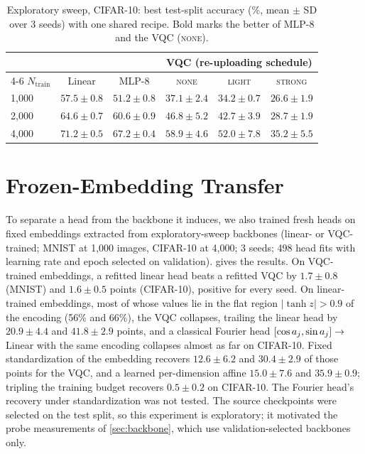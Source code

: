 \begin{table}[h]
\centering
\caption{Exploratory sweep, CIFAR-10: best test-split accuracy (\%, mean $\pm$ SD over 3
seeds) with one shared recipe. Bold marks the better of MLP-8 and the VQC (\textsc{none}).}
\label{tab:cifar}
\small
\begin{tabular}{lccccc}
\toprule
& & & \multicolumn{3}{c}{VQC (re-uploading schedule)} \\
\cmidrule(lr){4-6}
$N_\mathrm{train}$ & Linear & MLP-8 & \textsc{none} & \textsc{light} & \textsc{strong} \\
\midrule
1,000 & $57.5 \pm 0.8$ & $\mathbf{51.2 \pm 0.8}$ & $37.1 \pm 2.4$ & $34.2 \pm 0.7$ & $26.6 \pm 1.9$ \\
2,000 & $64.6 \pm 0.7$ & $\mathbf{60.6 \pm 0.9}$ & $46.8 \pm 5.2$ & $42.7 \pm 3.9$ & $28.7 \pm 1.9$ \\
4,000 & $71.2 \pm 0.5$ & $\mathbf{67.2 \pm 0.4}$ & $58.9 \pm 4.6$ & $52.0 \pm 7.8$ & $35.2 \pm 5.5$ \\
\bottomrule
\end{tabular}
\end{table}

\section{Frozen-Embedding Transfer}
\label{app:frozen}

To separate a head from the backbone it induces, we also trained fresh heads on fixed
embeddings extracted from exploratory-sweep backbones (linear- or VQC-trained; MNIST at
1,000 images, CIFAR-10 at 4,000; 3 seeds; 498 head fits with learning rate and epoch selected
on validation).  gives the results. On VQC-trained embeddings, a refitted
linear head beats a refitted VQC by $1.7\pm0.8$ (MNIST) and $1.6\pm0.5$ points (CIFAR-10),
positive for every seed. On linear-trained embeddings, most of whose values lie in the flat
region $|\tanh z|>0.9$ of the encoding (56\% and 66\%), the VQC collapses, trailing the
linear head by $20.9\pm4.4$ and $41.8\pm2.9$ points, and a classical Fourier head
$[\cos a_{j},\sin a_{j}]\to$ Linear with the same encoding collapses almost as far on
CIFAR-10. Fixed standardization of the embedding recovers $12.6\pm6.2$ and $30.4\pm2.9$ of
those points for the VQC, and a learned per-dimension affine $15.0\pm7.6$ and
$35.9\pm0.9$; tripling the training budget recovers $0.5\pm0.2$ on CIFAR-10. The Fourier
head's recovery under standardization was not tested. The source checkpoints were selected
on the test split, so this experiment is exploratory; it motivated the probe measurements of
\cref{sec:backbone}, which use validation-selected backbones only.

